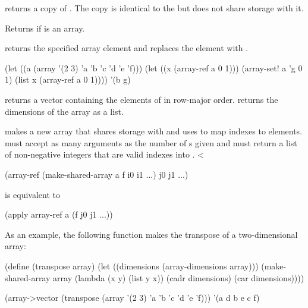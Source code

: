  returns a copy of .
The copy is identical to the  but does not share storage with it.

\begin{protos}
\end{protos}
\noindent
Returns  if  is an array.

\begin{protos}
\end{protos}
\noindent
{} returns the specified array element and 
 replaces the element with .
\begin{example}
(let ((a (array '(2 3) 'a 'b 'c 'd 'e 'f)))
  (let ((x (array-ref a 0 1)))
    (array-set! a 'g 0 1)
    (list x (array-ref a 0 1))))
    \evalsto '(b g)
\end{example}

 returns a vector containing the elements of 
 in row-major order.
 returns the dimensions of
 the array as a list.

\begin{protos}
\end{protos}
\noindent
{} makes a new array that shares storage with 
 and uses  to map indexes to elements.
 must accept as many arguments as the number of
 s given and must return a list of non-negative integers
 that are valid indexes into .
<\begin{example}
(array-ref (make-shared-array a f i0 i1 ...)
           j0 j1 ...)
\end{example}
is equivalent to
\begin{example}
(apply array-ref a (f j0 j1 ...))
\end{example}

As an example, the following function makes the transpose of a two-dimensional
 array:
\begin{example}
(define (transpose array)
  (let ((dimensions (array-dimensions array)))
    (make-shared-array array
                       (lambda (x y)
                         (list y x))
                       (cadr dimensions)
                       (car dimensions))))

(array->vector
  (transpose
    (array '(2 3) 'a 'b 'c 'd 'e 'f)))
      \evalsto '(a d b e c f)
\end{example}

